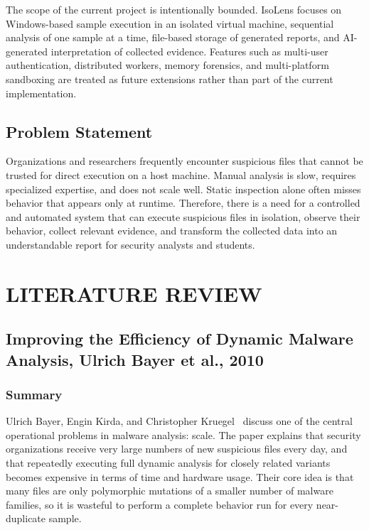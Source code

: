 \documentclass[a4paper,12pt,oneside]{report}
\begin{document}
\par

\par

The scope of the current project is intentionally bounded. IsoLens focuses on Windows-based sample execution in an isolated virtual machine, sequential analysis of one sample at a time, file-based storage of generated reports, and AI-generated interpretation of collected evidence. Features such as multi-user authentication, distributed workers, memory forensics, and multi-platform sandboxing are treated as future extensions rather than part of the current implementation.

\section{Problem Statement}
Organizations and researchers frequently encounter suspicious files that cannot be trusted for direct execution on a host machine. Manual analysis is slow, requires specialized expertise, and does not scale well. Static inspection alone often misses behavior that appears only at runtime. Therefore, there is a need for a controlled and automated system that can execute suspicious files in isolation, observe their behavior, collect relevant evidence, and transform the collected data into an understandable report for security analysts and students.

\chapter{LITERATURE REVIEW}
\section{Improving the Efficiency of Dynamic Malware Analysis, Ulrich Bayer et al., 2010}

\subsection{Summary}
Ulrich Bayer, Engin Kirda, and Christopher Kruegel~\cite{bayer2010} discuss one of the central operational problems in malware analysis: scale. The paper explains that security organizations receive very large numbers of new suspicious files every day, and that repeatedly executing full dynamic analysis for closely related variants becomes expensive in terms of time and hardware usage. Their core idea is that many files are only polymorphic mutations of a smaller number of malware families, so it is wasteful to perform a complete behavior run for every near-duplicate sample.
\end{document}
